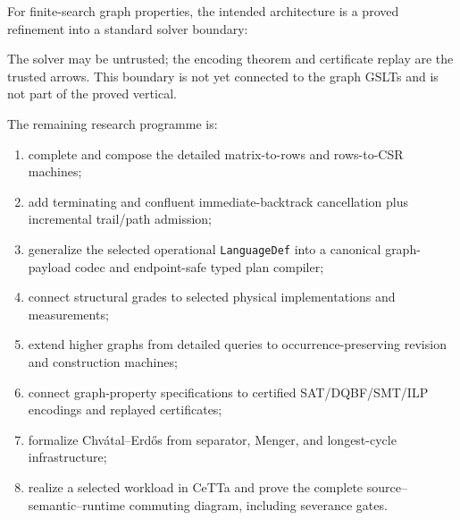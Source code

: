 \documentclass[11pt]{article}
\theoremstyle{remark}
\newcommand{\code}[1]{\texttt{#1}}
\begin{document}
For finite-search graph properties, the intended architecture is a proved
refinement into a standard solver boundary:
\begin{center}
\end{center}
The solver may be untrusted; the encoding theorem and certificate replay are
the trusted arrows.  This boundary is not yet connected to the graph GSLTs and
is not part of the proved vertical.

The remaining research programme is:
\begin{enumerate}[label=\arabic*.,leftmargin=2.2em]
  \item complete and compose the detailed matrix-to-rows and rows-to-CSR
        machines;
  \item add terminating and confluent immediate-backtrack cancellation plus incremental
        trail/path admission;
  \item generalize the selected operational \code{LanguageDef} into a
        canonical graph-payload codec and endpoint-safe typed plan compiler;
  \item connect structural grades to selected physical implementations and
        measurements;
  \item extend higher graphs from detailed queries to occurrence-preserving
        revision and construction machines;
  \item connect graph-property specifications to certified
        SAT/DQBF/SMT/ILP encodings and replayed certificates;
  \item formalize Chv\'atal--Erd\H{o}s from separator, Menger, and
        longest-cycle infrastructure;
  \item realize a selected workload in CeTTa and prove the complete
        source--semantic--runtime commuting diagram, including severance
        gates.
\end{enumerate}
\end{document}
